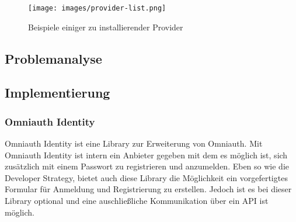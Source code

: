 \documentclass[11pt]{article}
\begin{document}
	\begin{figure}[h]
		\texttt{[image: images/provider-list.png]}
		\caption{Beispiele einiger zu installierender Provider}
		\label{fig:provider-list}
	\end{figure}
	
	\subsection{Problemanalyse}
	\label{sec: analyze}
	
	\subsection{Implementierung}
	\label{sec: implementation}
	
	\subsubsection{Omniauth Identity}
	\label{sec: omniauth_identity}
	Omniauth Identity ist eine Library zur Erweiterung von Omniauth. Mit Omniauth Identity ist intern ein Anbieter gegeben mit dem es möglich ist, sich zusätzlich mit einem Passwort zu registrieren und anzumelden. Eben so wie die Developer Strategy, bietet auch diese Library die Möglichkeit ein vorgefertigtes Formular für Anmeldung und Registrierung zu erstellen. Jedoch ist es bei dieser Library optional und eine auschließliche Kommunikation über ein API ist möglich. 
	
\end{document}
